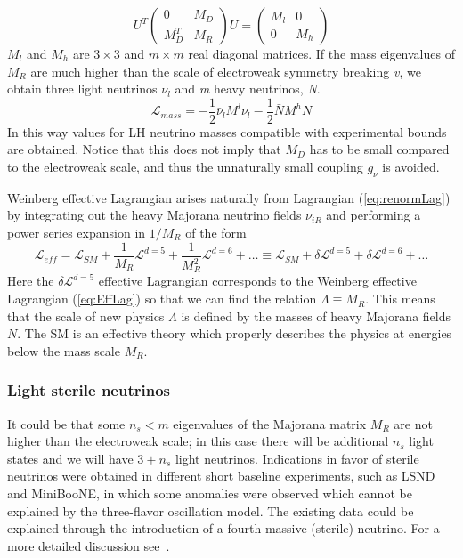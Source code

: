 \documentclass{subnucbo}
\begin{document}
\begin{equation}
U^T\begin{pmatrix}0 & M_D\\ M_D^T & M_R\end{pmatrix}U=\begin{pmatrix}M_l & 0 \\ 0 & M_h\end{pmatrix}
\end{equation}
$M_l$ and $M_h$ are $3\times3$ and $m\times m$ real diagonal matrices. If the mass eigenvalues of $M_R$ are much higher than the scale of electroweak symmetry breaking \emph{v}, we obtain three light neutrinos $\nu_l$ and \emph{m} heavy neutrinos, \emph{N}.
\begin{equation}
\mathcal{L}_{mass}=-\frac{1}{2}\bar{\nu}_lM^l\nu_l-\frac{1}{2}\bar{N}M^hN
\end{equation}
In this way values for LH neutrino masses compatible with experimental bounds are obtained. Notice that this does not imply that $M_D$ has to be small compared to the electroweak scale, and thus the unnaturally small coupling $g_{\nu}$ is avoided.

Weinberg effective Lagrangian arises naturally from Lagrangian (\ref{eq:renormLag}) by integrating out the heavy Majorana neutrino fields $\nu_{iR}$ and performing a power series expansion in $1/M_R$ of the form
\begin{equation}
\mathcal{L}_{eff}=\mathcal{L}_{SM}+\frac{1}{M_R}\mathcal{L}^{d=5}+\frac{1}{M_R^2}\mathcal{L}^{d=6}+\dots
\equiv \mathcal{L}_{SM}+\delta\mathcal{L}^{d=5}+\delta\mathcal{L}^{d=6}+\dots
\end{equation}
Here the $\delta\mathcal{L}^{d=5}$ effective Lagrangian corresponds to the Weinberg effective Lagrangian (\ref{eq:EffLag}) so that we can find the relation $\Lambda\equiv M_R$.
This means that the scale of new physics $\Lambda$ is defined by the masses of heavy Majorana fields $N$.
The SM is an effective theory which properly describes the physics at energies below the mass scale $M_R$.

\subsubsection{Light sterile neutrinos}
It could be that some $n_s<m$ eigenvalues of the Majorana matrix $M_R$ are not higher than the electroweak scale; in this case there will be additional $n_s$ light states and we will have $3+n_s$ light neutrinos.
Indications in favor of sterile neutrinos were obtained in different short baseline experiments, such as LSND and MiniBooNE, in which some anomalies were observed which cannot be explained by the three-flavor oscillation model.
The existing data could be explained through the introduction of a fourth massive (sterile) neutrino. For a more detailed discussion see~\cite[pp.~39-42]{ref:pdg}.  
\end{document}
